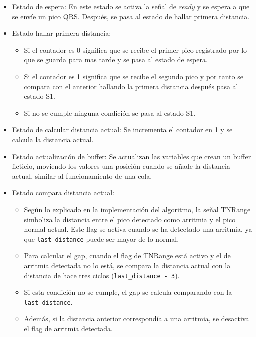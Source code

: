 \begin{itemize}
    \item Estado de espera: En este estado se activa la señal de \textit{ready} y se espera a que se envíe un pico QRS. Después, se pasa al estado de hallar primera distancia.
    \item Estado hallar primera distancia: 
    \begin{itemize}
        \item Si el contador es 0 significa que se recibe el primer pico registrado por lo que se guarda para mas tarde y se pasa al estado de espera.
        \item Si el contador es 1 significa que se recibe el segundo pico y por tanto se compara con el anterior hallando la primera distancia después pasa al estado S1.
        \item Si no se cumple ninguna condición se pasa al estado S1.   
    \end{itemize}
    \item Estado de calcular distancia actual: Se incrementa el contador en 1 y se calcula la distancia actual.
    \item Estado actualización de buffer: Se actualizan las variables que crean un buffer ficticio, moviendo los valores una posición cuando se añade la distancia actual, similar al funcionamiento de una cola.
    \item Estado compara distancia actual: 
    \begin{itemize}
        \item Según lo explicado en la implementación del algoritmo, la señal TNRange simboliza la distancia entre el pico detectado como arritmia y el pico normal actual. Este flag se activa cuando se ha detectado una arritmia, ya que \texttt{last\_distance} puede ser mayor de lo normal.
        \item Para calcular el gap, cuando el flag de TNRange está activo y el de arritmia detectada no lo está, se compara la distancia actual con la distancia de hace tres ciclos (\texttt{last\_distance - 3}).
        \item Si esta condición no se cumple, el gap se calcula comparando con la \texttt{last\_distance}.
        \item Además, si la distancia anterior correspondía a una arritmia, se desactiva el flag de arritmia detectada.
    \end{itemize}


\end{itemize}
